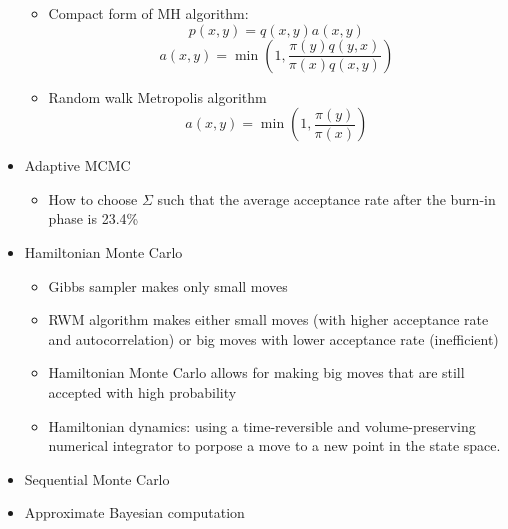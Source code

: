 \documentclass[a4paper]{article}
\begin{document}
\begin{itemize}
\begin{itemize}
        \item Compact form of MH algorithm:
        \[p(x,y)=q(x,y)a(x,y) \]
        \[a(x,y)=\min\left(1,\frac{\pi(y)q(y,x)}{\pi(x)q(x,y)} \right) \]
        \item Random walk Metropolis algorithm
        \[a(x,y)=\min\left(1,\frac{\pi(y)}{\pi(x)} \right) \]
    \end{itemize}
    \item Adaptive MCMC
    \begin{itemize}
        \item How to choose $\Sigma$ such that the average acceptance rate after the burn-in phase is 23.4\%
    \end{itemize}
    \item Hamiltonian Monte Carlo
    \begin{itemize}
        \item Gibbs sampler makes only small moves
        \item RWM algorithm makes either small moves (with higher acceptance rate and autocorrelation) or big moves with lower acceptance rate (inefficient)
        \item Hamiltonian Monte Carlo allows for making big moves that are still accepted with high probability
        \item Hamiltonian dynamics: using a time-reversible and volume-preserving numerical integrator to porpose a move to a new point in the state space.
    \end{itemize}
    \item Sequential Monte Carlo
    \item Approximate Bayesian computation
\end{itemize}
\end{document}
